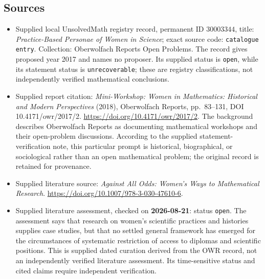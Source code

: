 \documentclass[11pt]{article}
\begin{document}
\subsection{Sources}
\begin{itemize}
\item Supplied local UnsolvedMath registry record, permanent ID \(30003344\), title: \emph{Practice-Based Personae of Women in Science}; exact source code: \texttt{catalogue entry}. Collection: Oberwolfach Reports Open Problems. The record gives proposed year 2017 and names no proposer. Its supplied status is \texttt{open}, while its statement status is \texttt{unrecoverable}; these are registry classifications, not independently verified mathematical conclusions.
\item Supplied report citation: \emph{Mini-Workshop: Women in Mathematics: Historical and Modern Perspectives} (2018), Oberwolfach Reports, pp.\ 83--131, DOI 10.4171/owr/2017/2. \url{https://doi.org/10.4171/owr/2017/2}. The background describes Oberwolfach Reports as documenting mathematical workshops and their open-problem discussions. According to the supplied statement-verification note, this particular prompt is historical, biographical, or sociological rather than an open mathematical problem; the original record is retained for provenance.
\item Supplied literature source: \emph{Against All Odds: Women's Ways to Mathematical Research}. \url{https://doi.org/10.1007/978-3-030-47610-6}.
\item Supplied literature assessment, checked on \textbf{2026-08-21}: status \texttt{open}. The assessment says that research on women's scientific practices and histories supplies case studies, but that no settled general framework has emerged for the circumstances of systematic restriction of access to diplomas and scientific positions. This is supplied dated curation derived from the OWR record, not an independently verified literature assessment. Its time-sensitive status and cited claims require independent verification.
\end{itemize}
\end{document}
